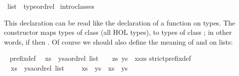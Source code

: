 %
\begin{isabellebody}%
\def\isabellecontext{Overloading}%
\isamarkupfalse%
%
\isadelimtheory
%
\endisadelimtheory
%
\isatagtheory
%
\endisatagtheory
{\isafoldtheory}%
%
\isadelimtheory
%
\endisadelimtheory
{}\isamarkupfalse%
\ list\ {\isacharcolon}{\isacharcolon}\ {\isacharparenleft}type{\isacharparenright}ordrel\isanewline
%
\isadelimproof
%
\endisadelimproof
%
\isatagproof
{}\isamarkupfalse%
\ intro{\isacharunderscore}classes%
\endisatagproof
{\isafoldproof}%
%
\isadelimproof
%
\endisadelimproof
%
\begin{isamarkuptext}%
\noindent
This  declaration can be read like the declaration of
a function on types.  The constructor  maps types of class  (all HOL types), to types of class ;
in other words,
if  then .
Of course we should also define the meaning of \isa{{\isacharless}{\isacharless}{\isacharequal}} and
\isa{{\isacharless}{\isacharless}} on lists:%
\end{isamarkuptext}%
\isamarkuptrue%
\isamarkupfalse%
\ {\isacharparenleft}\isanewline
prefix{\isacharunderscore}def{\isacharcolon}\isanewline
\ \ {\isachardoublequoteopen}xs\ {\isacharless}{\isacharless}{\isacharequal}\ {\isacharparenleft}ys{\isacharcolon}{\isacharcolon}{\isacharprime}a{\isacharcolon}{\isacharcolon}ordrel\ list{\isacharparenright}\ \ {\isasymequiv}\ \ {\isasymexists}zs{\isachardot}\ ys\ {\isacharequal}\ xs{\isacharat}zs{\isachardoublequoteclose}\isanewline
strict{\isacharunderscore}prefix{\isacharunderscore}def{\isacharcolon}\isanewline
\ \ {\isachardoublequoteopen}xs\ {\isacharless}{\isacharless}\ {\isacharparenleft}ys{\isacharcolon}{\isacharcolon}{\isacharprime}a{\isacharcolon}{\isacharcolon}ordrel\ list{\isacharparenright}\ \ \ {\isasymequiv}\ \ xs\ {\isacharless}{\isacharless}{\isacharequal}\ ys\ {\isasymand}\ xs\ {\isasymnoteq}\ ys{\isachardoublequoteclose}%
\isadelimtheory
%
\endisadelimtheory
%
\isatagtheory
%
\endisatagtheory
{\isafoldtheory}%
%
\isadelimtheory
%
\endisadelimtheory
\end{isabellebody}%
